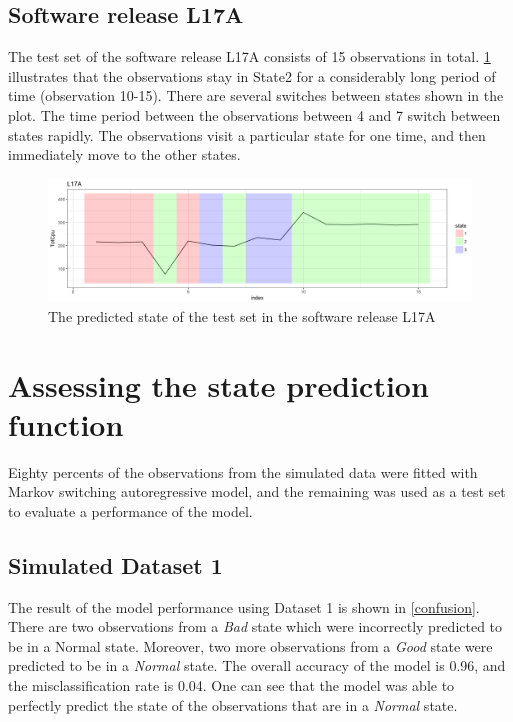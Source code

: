 \subsection{Software release L17A}

The test set of the software release L17A consists of 15 observations
in total. \ref{predict_L17A} illustrates that the observations stay
in State2 for a considerably long period of time (observation 10-15).
There are several switches between states shown in the plot. The time
period between the observations between 4 and 7 switch between states
rapidly. The observations visit a particular state for one time, and
then immediately move to the other states. 

\begin{figure}[h]
\begin{centering}
\includegraphics[scale=0.35]{picture/predict_L17A1}
\par\end{centering}
\caption{The predicted state of the test set in the software release L17A}
\label{predict_L17A}
\end{figure}


\section{Assessing the state prediction function \label{sec:Assessing}}

Eighty percents of the observations from the simulated data were fitted
with Markov switching autoregressive model, and the remaining was
used as a test set to evaluate a performance of the model. 

\subsection{Simulated Dataset 1}

The result of the model performance using Dataset 1 is shown in \ref{confusion}.
There are two observations from a \emph{Bad} state which were incorrectly
predicted to be in a Normal state. Moreover, two more observations
from a \emph{Good} state were predicted to be in a \emph{Normal} state.
The overall accuracy of the model is 0.96, and the misclassification
rate is 0.04. One can see that the model was able to perfectly predict
the state of the observations that are in a \emph{Normal} state. 


